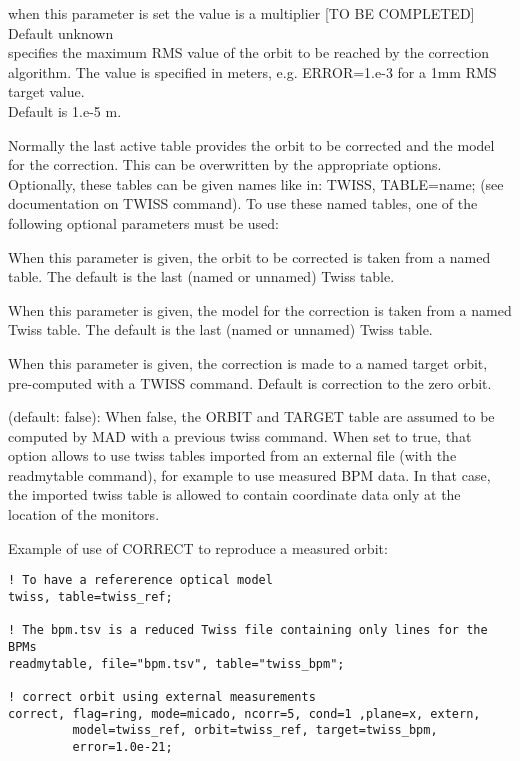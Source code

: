 \begin{madlist}
    when this parameter is set the value is a multiplier [TO BE COMPLETED] 
     \\ Default unknown \\

    specifies the maximum RMS value of the orbit to
     be reached by the correction algorithm. The value is specified in
     meters, e.g. ERROR=1.e-3 for a 1mm RMS target value. \\ Default is
     1.e-5 m.\\

\end{madlist}

Normally the last active table provides the orbit to be
corrected and the model for the correction. This can be overwritten
by the appropriate options. Optionally, these tables can be given
names like in:  TWISS, TABLE=name; (see documentation on TWISS
command). To use these named tables, one of the following optional
parameters must be  used:  

\begin{madlist}
    When this parameter is given, the orbit to be corrected
     is taken from a named table. The default is the last (named or
     unnamed) Twiss table.  

    When this parameter is given, the model for the
     correction is taken from a named Twiss table. The default is the
     last (named or unnamed) Twiss table.  

    When this parameter is given, the correction is made to
     a named target orbit, pre-computed with a TWISS command. Default is
     correction to the zero orbit.  

    (default: false): When false, the ORBIT and TARGET table
     are assumed to be computed by MAD with a previous twiss
     command. When set to true, that option allows to use twiss tables
     imported from an external file (with the readmytable command), for
     example to use measured BPM data. In that case, the imported twiss
     table is allowed to contain coordinate data only at the location of
     the monitors.  
\end{madlist}

Example of use of CORRECT to reproduce a measured orbit: 
\begin{verbatim}
! To have a refererence optical model
twiss, table=twiss_ref;

! The bpm.tsv is a reduced Twiss file containing only lines for the BPMs
readmytable, file="bpm.tsv", table="twiss_bpm";

! correct orbit using external measurements
correct, flag=ring, mode=micado, ncorr=5, cond=1 ,plane=x, extern,
         model=twiss_ref, orbit=twiss_ref, target=twiss_bpm, 
         error=1.0e-21;
\end{verbatim}


